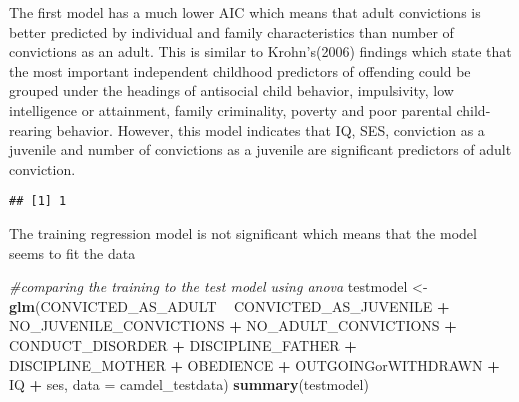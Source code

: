 \documentclass[]{article}
\newenvironment{Shaded}{\begin{snugshade}}{\end{snugshade}}
\newcommand{\KeywordTok}[1]{\textcolor[rgb]{0.13,0.29,0.53}{\textbf{#1}}}
\newcommand{\DataTypeTok}[1]{\textcolor[rgb]{0.13,0.29,0.53}{#1}}
\newcommand{\DecValTok}[1]{\textcolor[rgb]{0.00,0.00,0.81}{#1}}
\newcommand{\StringTok}[1]{\textcolor[rgb]{0.31,0.60,0.02}{#1}}
\newcommand{\CommentTok}[1]{\textcolor[rgb]{0.56,0.35,0.01}{\textit{#1}}}
\newcommand{\OperatorTok}[1]{\textcolor[rgb]{0.81,0.36,0.00}{\textbf{#1}}}
\newcommand{\NormalTok}[1]{#1}
\begin{document}
The first model has a much lower AIC which means that adult convictions
is better predicted by individual and family characteristics than number
of convictions as an adult. This is similar to Krohn's(2006) findings
which state that the most important independent childhood predictors of
offending could be grouped under the headings of antisocial child
behavior, impulsivity, low intelligence or attainment, family
criminality, poverty and poor parental child-rearing behavior. However,
this model indicates that IQ, SES, conviction as a juvenile and number
of convictions as a juvenile are significant predictors of adult
conviction.

\begin{Shaded}
\end{Shaded}

\begin{verbatim}
## [1] 1
\end{verbatim}

The training regression model is not significant which means that the
model seems to fit the data

\begin{Shaded}
\begin{Highlighting}[]
\CommentTok{#comparing the training to the test model using anova}
\NormalTok{testmodel <-}\StringTok{ }\KeywordTok{glm}\NormalTok{(CONVICTED_AS_ADULT }\OperatorTok{~}\StringTok{ }\NormalTok{CONVICTED_AS_JUVENILE }\OperatorTok{+}\StringTok{ }
\StringTok{                       }\NormalTok{NO_JUVENILE_CONVICTIONS }\OperatorTok{+}\StringTok{ }\NormalTok{NO_ADULT_CONVICTIONS }\OperatorTok{+}
\StringTok{                       }\NormalTok{CONDUCT_DISORDER }\OperatorTok{+}\StringTok{ }\NormalTok{DISCIPLINE_FATHER }\OperatorTok{+}\StringTok{ }
\StringTok{                       }\NormalTok{DISCIPLINE_MOTHER }\OperatorTok{+}\StringTok{  }\NormalTok{OBEDIENCE }\OperatorTok{+}\StringTok{ }\NormalTok{OUTGOINGorWITHDRAWN }\OperatorTok{+}\StringTok{ }
\StringTok{                       }\NormalTok{IQ }\OperatorTok{+}\StringTok{ }\NormalTok{ses, }\DataTypeTok{data =}\NormalTok{ camdel_testdata)}
\KeywordTok{summary}\NormalTok{(testmodel)}
\end{Highlighting}
\end{Shaded}
\end{document}
